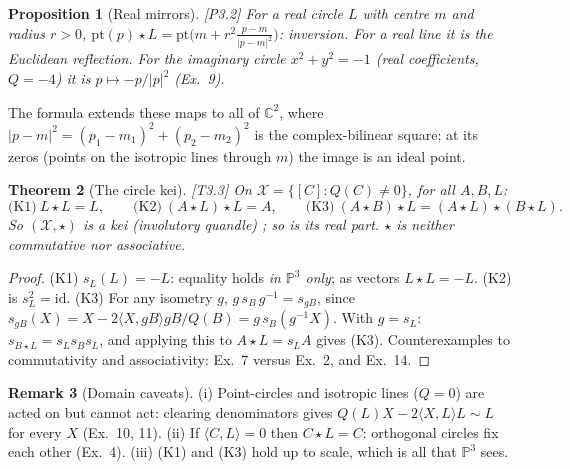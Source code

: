 \documentclass[11pt]{article}
\newtheorem{theorem}{Theorem}[section]\newtheorem{proposition}[theorem]{Proposition}
\theoremstyle{definition}\newtheorem{definition}[theorem]{Definition}\newtheorem{remark}[theorem]{Remark}\newtheorem{example}[theorem]{Example}
\newcommand{\C}{\mathbb{C}}\newcommand{\R}{\mathbb{R}}\newcommand{\PP}{\mathbb{P}}
\newcommand{\ip}[2]{\langle #1,#2\rangle}\newcommand{\pt}{\mathrm{pt}}\newcommand{\Qd}{\mathcal{Q}}
\newcommand{\chk}[1]{\hfill{\footnotesize\textsf{[#1]}}}
\begin{document}
\begin{proposition}[Real mirrors]\label{prop:real}\chk{P3.2}
For a real circle $L$ with centre $m$ and radius $r>0$, $\pt(p)\star L=\pt\big(m+r^2\frac{p-m}{|p-m|^2}\big)$: inversion. For a real line it is the Euclidean reflection. For the imaginary circle $x^2+y^2=-1$ (real coefficients, $Q=-4$) it is $p\mapsto -p/|p|^2$ (Ex.~9).
\end{proposition}
The formula extends these maps to all of $\C^2$, where $|p-m|^2=(p_1-m_1)^2+(p_2-m_2)^2$ is the complex-bilinear square; at its zeros (points on the isotropic lines through $m$) the image is an ideal point.

\begin{theorem}[The circle kei]\label{thm:kei}\chk{T3.3}
On $\mathcal X=\{[C]:Q(C)\neq0\}$, for all $A,B,L$:
\[\text{(K1)}\ L\star L=L,\qquad \text{(K2)}\ (A\star L)\star L=A,\qquad \text{(K3)}\ (A\star B)\star L=(A\star L)\star(B\star L).\]
So $(\mathcal X,\star)$ is a kei (involutory quandle) \cite{Tak43,Joy82,Sta15}; so is its real part. $\star$ is neither commutative nor associative.
\end{theorem}
\begin{proof}
(K1) $s_L(L)=-L$: equality holds \emph{in $\PP^3$ only}; as vectors $L\star L=-L$. (K2) is $s_L^2=\mathrm{id}$. (K3) For any isometry $g$, $g\,s_B\,g^{-1}=s_{gB}$, since $s_{gB}(X)=X-2\ip{X}{gB}gB/Q(B)=g\,s_B(g^{-1}X)$. With $g=s_L$: $s_{B\star L}=s_Ls_Bs_L$, and applying this to $A\star L=s_LA$ gives (K3). Counterexamples to commutativity and associativity: Ex.~7 versus Ex.~2, and Ex.~14.
\end{proof}
\begin{remark}[Domain caveats]\label{rem:dom}
(i) Point-circles and isotropic lines ($Q=0$) are acted on but cannot act: clearing denominators gives $Q(L)X-2\ip XLL\sim L$ for every $X$ (Ex.~10, 11). (ii) If $\ip CL=0$ then $C\star L=C$: orthogonal circles fix each other (Ex.~4). (iii) (K1) and (K3) hold up to scale, which is all that $\PP^3$ sees.
\end{remark}
\end{document}
